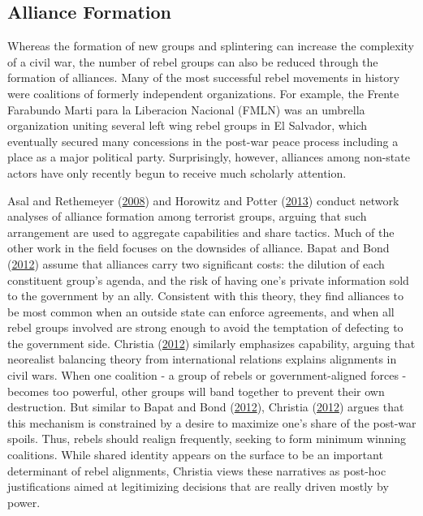 \documentclass[12pt,]{book}
\theoremstyle{definition}
\theoremstyle{definition}
\theoremstyle{definition}
\theoremstyle{remark}
\begin{document}
\hypertarget{alliance-formation}{%
\subsection{Alliance Formation}\label{alliance-formation}}

Whereas the formation of new groups and splintering can increase the
complexity of a civil war, the number of rebel groups can also be
reduced through the formation of alliances. Many of the most successful
rebel movements in history were coalitions of formerly independent
organizations. For example, the Frente Farabundo Marti para la
Liberacion Nacional (FMLN) was an umbrella organization uniting several
left wing rebel groups in El Salvador, which eventually secured many
concessions in the post-war peace process including a place as a major
political party. Surprisingly, however, alliances among non-state actors
have only recently begun to receive much scholarly attention.

Asal and Rethemeyer (\protect\hyperlink{ref-Asal2008}{2008}) and
Horowitz and Potter (\protect\hyperlink{ref-Horowitz2013}{2013}) conduct
network analyses of alliance formation among terrorist groups, arguing
that such arrangement are used to aggregate capabilities and share
tactics. Much of the other work in the field focuses on the downsides of
alliance. Bapat and Bond (\protect\hyperlink{ref-Bapat2012}{2012})
assume that alliances carry two significant costs: the dilution of each
constituent group's agenda, and the risk of having one's private
information sold to the government by an ally. Consistent with this
theory, they find alliances to be most common when an outside state can
enforce agreements, and when all rebel groups involved are strong enough
to avoid the temptation of defecting to the government side. Christia
(\protect\hyperlink{ref-Christia2012}{2012}) similarly emphasizes
capability, arguing that neorealist balancing theory from international
relations explains alignments in civil wars. When one coalition - a
group of rebels or government-aligned forces - becomes too powerful,
other groups will band together to prevent their own destruction. But
similar to Bapat and Bond (\protect\hyperlink{ref-Bapat2012}{2012}),
Christia (\protect\hyperlink{ref-Christia2012}{2012}) argues that this
mechanism is constrained by a desire to maximize one's share of the
post-war spoils. Thus, rebels should realign frequently, seeking to form
minimum winning coalitions. While shared identity appears on the surface
to be an important determinant of rebel alignments, Christia views these
narratives as post-hoc justifications aimed at legitimizing decisions
that are really driven mostly by power.
\end{document}
